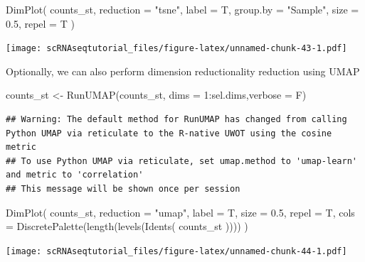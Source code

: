\documentclass[
  openany]{book}
\newenvironment{Shaded}{\begin{snugshade}}{\end{snugshade}}
\newcommand{\AttributeTok}[1]{\textcolor[rgb]{0.77,0.63,0.00}{#1}}
\newcommand{\DecValTok}[1]{\textcolor[rgb]{0.00,0.00,0.81}{#1}}
\newcommand{\FloatTok}[1]{\textcolor[rgb]{0.00,0.00,0.81}{#1}}
\newcommand{\FunctionTok}[1]{\textcolor[rgb]{0.00,0.00,0.00}{#1}}
\newcommand{\NormalTok}[1]{#1}
\newcommand{\OtherTok}[1]{\textcolor[rgb]{0.56,0.35,0.01}{#1}}
\newcommand{\SpecialCharTok}[1]{\textcolor[rgb]{0.00,0.00,0.00}{#1}}
\newcommand{\StringTok}[1]{\textcolor[rgb]{0.31,0.60,0.02}{#1}}
\begin{document}
\begin{Shaded}
\begin{Highlighting}[]
\FunctionTok{DimPlot}\NormalTok{(}
\NormalTok{  counts\_st,}
  \AttributeTok{reduction =} \StringTok{"tsne"}\NormalTok{,}
  \AttributeTok{label =}\NormalTok{ T,}
  \AttributeTok{group.by =} \StringTok{"Sample"}\NormalTok{,}
  \AttributeTok{size =} \FloatTok{0.5}\NormalTok{,}
  \AttributeTok{repel =}\NormalTok{ T}
\NormalTok{)}
\end{Highlighting}
\end{Shaded}

\texttt{[image: scRNAseqtutorial\_files/figure-latex/unnamed-chunk-43-1.pdf]}

Optionally, we can also perform dimension reductionality reduction using UMAP

\begin{Shaded}
\begin{Highlighting}[]
\NormalTok{counts\_st }\OtherTok{\textless{}{-}} \FunctionTok{RunUMAP}\NormalTok{(counts\_st, }\AttributeTok{dims =} \DecValTok{1}\SpecialCharTok{:}\NormalTok{sel.dims,}\AttributeTok{verbose =}\NormalTok{ F)}
\end{Highlighting}
\end{Shaded}

\begin{verbatim}
## Warning: The default method for RunUMAP has changed from calling Python UMAP via reticulate to the R-native UWOT using the cosine metric
## To use Python UMAP via reticulate, set umap.method to 'umap-learn' and metric to 'correlation'
## This message will be shown once per session
\end{verbatim}

\begin{Shaded}
\begin{Highlighting}[]
\FunctionTok{DimPlot}\NormalTok{(}
\NormalTok{  counts\_st,}
  \AttributeTok{reduction =} \StringTok{"umap"}\NormalTok{,}
  \AttributeTok{label =}\NormalTok{ T,}
  \AttributeTok{size =} \FloatTok{0.5}\NormalTok{,}
  \AttributeTok{repel =}\NormalTok{ T,}
  \AttributeTok{cols =} \FunctionTok{DiscretePalette}\NormalTok{(}\FunctionTok{length}\NormalTok{(}\FunctionTok{levels}\NormalTok{(}\FunctionTok{Idents}\NormalTok{(}
\NormalTok{    counts\_st}
\NormalTok{  ))))}
\NormalTok{)}
\end{Highlighting}
\end{Shaded}

\texttt{[image: scRNAseqtutorial\_files/figure-latex/unnamed-chunk-44-1.pdf]}
\end{document}
